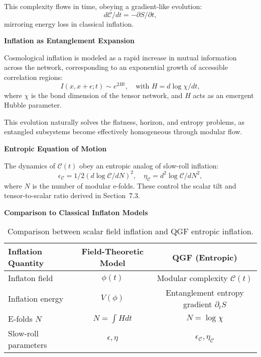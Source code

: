 \documentclass[11pt]{article}
\def\frac#1#2{#1/#2}
\def\left{}
\def\right{}
\begin{document}
This complexity flows in time, obeying a gradient-like evolution:
\[
\frac{d\mathcal{C}}{dt} = - \frac{\partial S}{\partial t},
\]
mirroring energy loss in classical inflation.

\vspace{0.5em}
\noindent\textbf{Inflation as Entanglement Expansion}

Cosmological inflation is modeled as a rapid increase in mutual information across the network, corresponding to an exponential growth of accessible correlation regions:
\[
I(x, x+\epsilon; t) \sim e^{2Ht}, \quad \text{with } H = \frac{d \log \chi}{dt},
\]
where \( \chi \) is the bond dimension of the tensor network, and \( H \) acts as an emergent Hubble parameter.

This evolution naturally solves the flatness, horizon, and entropy problems, as entangled subsystems become effectively homogeneous through modular flow.

\vspace{0.5em}
\noindent\textbf{Entropic Equation of Motion}

The dynamics of \( \mathcal{C}(t) \) obey an entropic analog of slow-roll inflation:
\[
\epsilon_{\mathcal{C}} = \frac{1}{2} \left( \frac{d \log \mathcal{C}}{dN} \right)^2, \quad \eta_{\mathcal{C}} = \frac{d^2 \log \mathcal{C}}{dN^2},
\]
where \( N \) is the number of modular e-folds. These control the scalar tilt and tensor-to-scalar ratio derived in Section~7.3.

\vspace{0.5em}
\noindent\textbf{Comparison to Classical Inflaton Models}

\begin{table}[H]
\centering
\renewcommand{\arraystretch}{1.2}
\begin{tabular}{|l|c|c|}
\hline
\textbf{Inflation Quantity} & \textbf{Field-Theoretic Model} & \textbf{QGF (Entropic)} \\
\hline
Inflaton field & \( \phi(t) \) & Modular complexity \( \mathcal{C}(t) \) \\
Inflation energy & \( V(\phi) \) & Entanglement entropy gradient \( \partial_t S \) \\
E-folds \( N \) & \( N = \int H dt \) & \( N = \log \chi \) \\
Slow-roll parameters & \( \epsilon, \eta \) & \( \epsilon_{\mathcal{C}}, \eta_{\mathcal{C}} \) \\
\hline
\end{tabular}
\caption{Comparison between scalar field inflation and QGF entropic inflation.}
\label{tab:inflation-compare}
\end{table}
\end{document}
